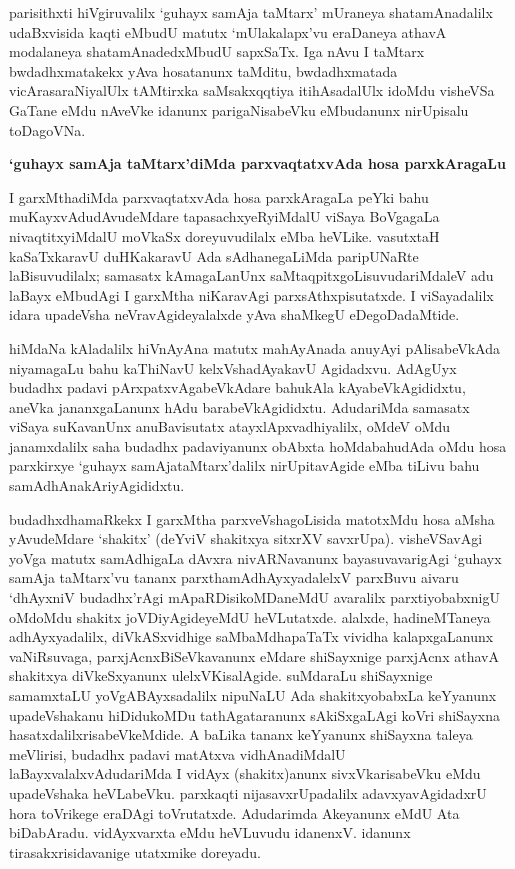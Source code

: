 parisithxti hiVgiruvalilx `guhayx samAja taMtarx' mUraneya shatamAnadalilx udaBxvisida kaqti eMbudU matutx `mUlakalapx'vu eraDaneya athavA modalaneya shatamAna\-dedxMbudU sapxSaTx. Iga nAvu I taMtarx bwdadhxmatakekx yAva hosatanunx taMditu, bwdadhxmatada vicArasaraNiyalUlx tAMtirxka saMsakxqqtiya itihAsadalUlx idoMdu visheVSa GaTane eMdu nAveVke idanunx parigaNisabeVku eMbudanunx nirUpisalu toDagoVNa. 

\bigskip
\begin{center}
{\Large\bf `guhayx samAja taMtarx'diMda parxvaqtatxvAda hosa parxkAragaLu}
\end{center}

I garxMthadiMda parxvaqtatxvAda hosa parxkAragaLa peYki bahu muKayxvAdudAvudeMdare tapasachxyeRyiMdalU viSaya BoVgagaLa nivaqtitxyiMdalU moVkaSx doreyuvudilalx eMba heVLike. vasutxtaH kaSaTxkaravU duHKakaravU Ada sAdhanegaLiMda paripUNaRte laBisuvudilalx; samasatx kAmagaLanUnx saMtaqpitxgoLisuvudariMdaleV adu laBayx eMbudAgi I garxMtha niKaravAgi parxsAthxpisutatxde. I viSayadalilx idara upadeVsha neVravAgideyalalxde yAva shaMkegU eDegoDadaMtide.

hiMdaNa kAladalilx hiVnAyAna matutx mahAyAnada anuyAyi pAlisa\-beVkAda niyamagaLu bahu kaThiNavU kelxVshadAyakavU Agidadxvu. AdAgUyx budadhx padavi pArxpatxvAgabeVkAdare bahukAla kAyabeVkAgididxtu, aneVka jananxgaLanunx hAdu barabeVkAgididxtu. AdudariMda samasatx viSaya suKavanUnx anuBavisutatx atayxlApxvadhiyalilx, oMdeV oMdu janamxdalilx saha budadhx padaviyanunx obAbxta hoMdabahudAda oMdu hosa parxkirxye `guhayx samAjataMtarx'dalilx nirUpitavAgide eMba tiLivu bahu samAdhAnakAriyAgididxtu.

budadhxdhamaRkekx I garxMtha parxveVshagoLisida matotxMdu hosa aMsha yAvu\-deMdare `shakitx' (deYviV shakitxya sitxrXV savxrUpa). visheVSavAgi yoVga matutx samAdhigaLa dAvxra nivARNavanunx bayasuvavarigAgi `guhayx samAja taMtarx'vu tananx parxthamAdhAyxyadalelxV parxBuvu aivaru `dhAyxniV budadhx'rAgi mApaRDisikoMDaneMdU avaralilx parxtiyobabxnigU oMdoMdu shakitx joVDiyAgideyeMdU heVLutatxde. alalxde, hadineMTaneya adhAyxyadalilx, diVkASxvidhige saMbaMdhapaTaTx vividha kalapxgaLanunx vaNiRsuvaga, parxjAcnxBiSeVkavanunx eMdare shiSayxnige parxjAcnx athavA shakitxya diVkeSxyanunx ulelxVKisalAgide. suMdaraLu shiSayxnige samamxtaLU yoVgABAyxsadalilx nipuNaLU Ada shakitxyobabxLa keYyanunx upadeVshakanu hiDidukoMDu tathAgataranunx sAkiSxgaLAgi koVri shiSayxna hasatxdalilxrisabeVkeMdide. A baLika tananx keYyanunx shiSayxna taleya meVlirisi, budadhx padavi matAtxva vidhAnadiMdalU laBayxvalalxvAdudariMda I vidAyx (shakitx)anunx sivxVkarisabeVku eMdu upadeVshaka heVLabeVku. parxkaqti nijasavxrUpadalilx adavxyavAgidadxrU hora toVrikege eraDAgi toVrutatxde. Adudarimda Akeyanunx eMdU Ata biDabAradu. vidAyxvarxta eMdu heVLuvudu idanenxV. idanunx tirasakxrisidavanige utatxmike doreyadu.

